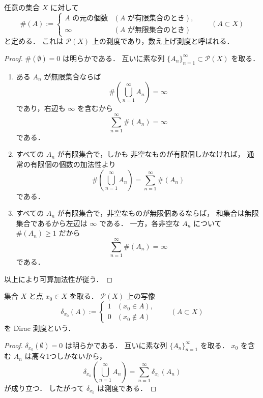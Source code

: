 \begin{example}[数え上げ測度]
任意の集合 $X$ に対して
\[
\#(A):=
\begin{cases}
\text{$A$ の元の個数} & (A \text{ が有限集合のとき}),\\
\infty & (A \text{ が無限集合のとき})
\end{cases}
\qquad
(A \subset X)
\]
と定める．
これは $\mathcal P(X)$ 上の測度であり，数え上げ測度と呼ばれる．
\end{example}
\begin{proof}
$\#(\emptyset)=0$ は明らかである．
互いに素な列 $\{A_n\}_{n=1}^{\infty}\subset\mathcal P(X)$ を取る．

\begin{enumerate}
    \item ある $A_n$ が無限集合ならば
    \[
    \#\left(\bigcup_{n=1}^{\infty}A_n\right)=\infty
    \]
    であり，右辺も $\infty$ を含むから
    \[
    \sum_{n=1}^{\infty}\#(A_n)=\infty
    \]
    である．

    \item すべての $A_n$ が有限集合で，しかも
    非空なものが有限個しかなければ，
    通常の有限個の個数の加法性より
    \[
    \#\left(\bigcup_{n=1}^{\infty}A_n\right)
    =
    \sum_{n=1}^{\infty}\#(A_n)
    \]
    である．

    \item すべての $A_n$ が有限集合で，非空なものが無限個あるならば，
    和集合は無限集合であるから左辺は $\infty$ である．
    一方，各非空な $A_n$ について $\#(A_n)\ge 1$ だから
    \[
    \sum_{n=1}^{\infty}\#(A_n)=\infty
    \]
    である．
\end{enumerate}

以上により可算加法性が従う．
\end{proof}

\begin{example}[Dirac測度]
集合 $X$ と点 $x_0 \in X$ を取る．
$\mathcal P(X)$ 上の写像
\[
\delta_{x_0}(A)
:=
\begin{cases}
1 & (x_0 \in A),\\
0 & (x_0 \notin A)
\end{cases}
\qquad
(A \subset X)
\]
を Dirac 測度という．
\end{example}
\begin{proof}
$\delta_{x_0}(\emptyset)=0$ は明らかである．
互いに素な列 $\{A_n\}_{n=1}^{\infty}$ を取る．
$x_0$ を含む $A_n$ は高々1つしかないから，
\[
\delta_{x_0}\left(\bigcup_{n=1}^{\infty}A_n\right)
=
\sum_{n=1}^{\infty}\delta_{x_0}(A_n)
\]
が成り立つ．
したがって $\delta_{x_0}$ は測度である．
\end{proof}

